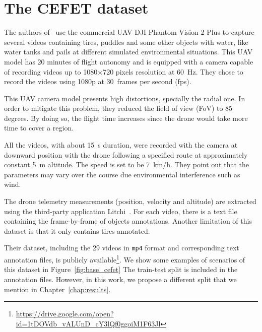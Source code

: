 
\section{The CEFET dataset}\label{sec:cefet_data}
%
The authors of~\cite{casfinal2018} use the commercial UAV DJI Phantom Vision 2 Plus to capture several videos containing tires, puddles and some other objects with water, like water tanks and pails at different simulated environmental situations.
This UAV model has 20 minutes of flight autonomy and is equipped with a camera capable of recording videos up to 1080$\times$720 pixels resolution at 60~Hz.
They chose to record the videos using 1080p at 30~frames per second (fps).

This UAV camera model presents high distortions, specially the radial one.
In order to mitigate this problem, they reduced the field of view (FoV) to 85 degrees.
By doing so, the flight time increases since the drone would take more time to cover a region.

All the videos, with about 15~s duration, were recorded with the camera at downward position with the drone following a specified route at
approximately constant 5~m altitude.
The speed is set to be 7~km/h.
They point out that the parameters may vary over the course due environmental interference such as wind.

The drone telemetry measurements (\eg position, velocity and altitude) are extracted using the third-party application Litchi~\cite{web:litchi}.
For each video, there is a text file containing the frame-by-frame of objects annotations.
Another limitation of this dataset is that it only contains tires annotated.

Their dataset, including the 29 videos in \verb|mp4| format and corresponding text annotation files, is publicly available\footnote{\url{https://drive.google.com/open?id=1tDOVdb_vALUnD_cY3lQf0ggoiM1F63Jl}}.
We show some examples of scenarios of this dataset in Figure~\ref{fig:base_cefet}
The train-test split is included in the annotation files.
However, in this work, we propose a different split that we mention in Chapter~\ref{chap:results}.

